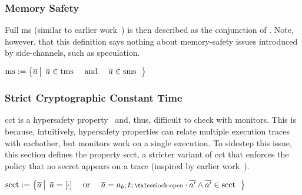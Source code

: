 \documentclass[utf8,acmsmall,review,screen,dvipsnames,anonymous]{acmart}
\begin{document}
\subsubsection{Memory Safety}

Full \gls{ms} (similar to earlier work~\cite{nagarakatte2009soft,nagarakatte2010cets,jim2002cyclone,necula2005ccured,michael2023mswasm}) is then described as the conjunction of .
Note, however, that this definition says nothing about memory-safety issues introduced by side-channels, such as speculation.

\begin{definition}[\glsfirst{ms}]\label{def:trace:msdef}
  $
  \operatorname{ms}:=\left\{\overline{a} \left|\begin{array}{rcl}
                                 \overline{a}\in\operatorname{tms} & \text{ and } & \overline{a}\in\operatorname{sms}
                               \end{array}\right.\right\}
  $
\end{definition}

\subsubsection{Strict Cryptographic Constant Time}

\gls{cct} is a hypersafety property~\cite{barthe2018sec} and, thus, difficult to check with monitors.
This is because, intuitively, hypersafety properties can relate multiple execution traces with eachother, but monitors work on a single execution.
To sidestep this issue, this section defines the property \gls{scct}, a stricter variant of \gls{cct} that enforces the policy that no secret appears on a trace (inspired by earlier work~\cite{almeida2017jasmin}).

\begin{definition}\label{def:trace:scctdef}
  $
  \scctsafe:=\left\{\trace \left|\begin{array}{rcl}
                                   \trace=\hole{\cdot} & \text{ or } & \trace=\event[_{b}];\sandboxtag;\unlock\cdot\trace['] \wedge \trace[']\in\scctsafe
                                 \end{array}\right.\right\}
  $
\end{definition}
\end{document}
